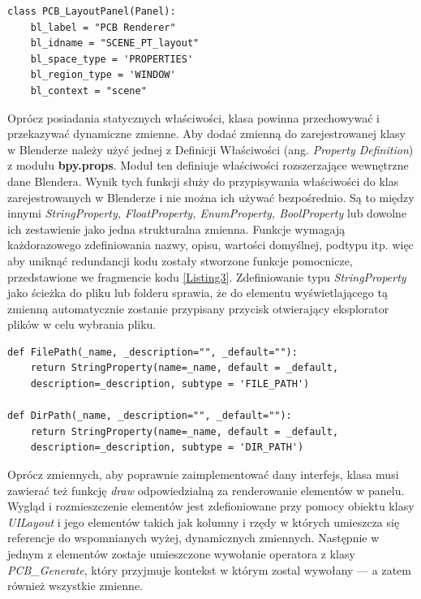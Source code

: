 \documentclass[brudnopis]{xmgr}
\begin{document}
\begin{lstlisting}
class PCB_LayoutPanel(Panel):
	bl_label = "PCB Renderer"
	bl_idname = "SCENE_PT_layout"
	bl_space_type = 'PROPERTIES'
	bl_region_type = 'WINDOW'
	bl_context = "scene"
\end{lstlisting}

\vspace{5mm}

Oprócz posiadania statycznych właściwości, klasa powinna przechowywać i przekazywać dynamiczne zmienne. Aby dodać zmienną do zarejestrowanej klasy w Blenderze należy użyć jednej z Definicji Właściwości (ang. \emph{Property Definition}) z modułu \textbf{bpy.props}. Moduł ten definiuje właściwości rozszerzające wewnętrzne dane Blendera. Wynik tych funkcji służy do przypisywania właściwości do klas zarejestrowanych w Blenderze i nie można ich używać bezpośrednio. Są to między innymi \emph{StringProperty, FloatProperty, EnumProperty, BoolProperty} lub dowolne ich zestawienie jako jedna strukturalna zmienna. Funkcje wymagają każdorazowego zdefiniowania nazwy, opisu, wartości domyślnej, podtypu itp. więc aby uniknąć redundancji kodu zostały stworzone funkcje pomocnicze, przedstawione we fragmencie kodu \ref{Listing3}. Zdefiniowanie typu \emph{StringProperty} jako ścieżka do pliku lub folderu sprawia, że do elementu wyświetlającego tą zmienną automatycznie zostanie przypisany przycisk otwierający eksplorator plików w celu wybrania pliku.

\newpage

\begin{lstlisting}
def FilePath(_name, _description="", _default=""):
	return StringProperty(name=_name, default = _default,
	description=_description, subtype = 'FILE_PATH')
    
def DirPath(_name, _description="", _default=""):
	return StringProperty(name=_name, default = _default,
	description=_description, subtype = 'DIR_PATH')
\end{lstlisting}

Oprócz zmiennych, aby poprawnie zaimplementować dany interfejs, klasa musi zawierać też funkcję \emph{draw} odpowiedzialną za renderowanie elementów w panelu. Wygląd i rozmieszczenie elementów jest zdefioniowane przy pomocy obiektu klasy \emph{UILayout} i jego elementów takich jak kolumny i rzędy w których umieszcza się referencje do wspomnianych wyżej, dynamicznych zmiennych. Następnie w jednym z elementów zostaje umieszczone wywołanie operatora z klasy \emph{PCB\_Generate}, który przyjmuje kontekst w którym zostal wywołany --- a zatem również wszystkie zmienne.
\end{document}
